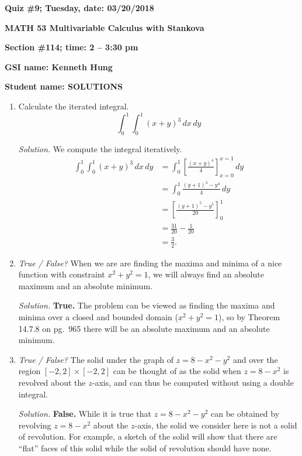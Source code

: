 \documentclass{article}
\begin{document}
{\bf Quiz \#9; Tuesday, date: 03/20/2018}

{\bf MATH 53 Multivariable Calculus with Stankova}

{\bf Section \#114; time: 2 -- 3:30 pm}

{\bf GSI name: Kenneth Hung}

{\bf Student name: SOLUTIONS}

\vspace*{0.25in}

\begin{enumerate}
\item Calculate the iterated integral.
\[
\int_0^1 \int_0^1 (x + y)^3 \,dx \,dy
\]

{\em Solution.} We compute the integral iteratively.
\begin{align*}
\int_0^1 \int_0^1 (x + y)^3 \,dx \,dy & = \int_0^1 \left[\frac{(x + y)^4}{4}\right]_{x = 0}^{x = 1} \,dy \\
& = \int_0^1 \frac{(y+1)^4 - y^4}{4} \,dy \\
& = \left[\frac{(y+1)^5 - y^5}{20}\right]_0^1 \\
& = \frac{31}{20} - \frac{1}{20} \\
& = \frac{3}{2}.
\end{align*}

\item {\em True / False?} When we are are finding the maxima and minima of a nice function with constraint $x^2 + y^2 = 1$, we will always find an absolute maximum and an absolute minimum.

{\em Solution.} {\bf True.} The problem can be viewed as finding the maxima and minima over a closed and bounded domain ($x^2 + y^2 = 1$), so by Theorem 14.7.8 on pg.\ 965 there will be an absolute maximum and an absolute minimum.

\item {\em True / False?} The solid under the graph of $z = 8 - x^2 - y^2$ and over the region $[-2, 2] \times [-2, 2]$ can be thought of as the solid when $z = 8 - x^2$ is revolved about the $z$-axis, and can thus be computed without using a double integral.

{\em Solution.} {\bf False.} While it is true that $z = 8 - x^2 - y^2$ can be obtained by revolving $z = 8 - x^2$ about the $z$-axis, the solid we consider here is not a solid of revolution. For example, a sketch of the solid will show that there are ``flat'' faces of this solid while the solid of revolution should have none.
\end{enumerate}
\end{document}
